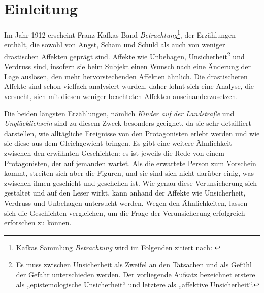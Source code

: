 \documentclass[12pt,a4paper]{article}
\begin{document}
\clearpage


\onehalfspacing
\setlength{\parskip}{0.5\baselineskip}

\section{Einleitung}
%
Im Jahr 1912 erscheint Franz Kafkas Band \textit{Betrachtung}\footnote{Kafkas Sammlung \textit{Betrachtung} wird im Folgenden zitiert nach: \cite{kafka}}, der Erzählungen enthält, die sowohl von Angst, Scham und Schuld als auch von weniger drastischen Affekten geprägt sind. Affekte wie Unbehagen, Unsicherheit\footnote{Es muss zwischen Unsicherheit als Zweifel an den Tatsachen und als Gefühl der Gefahr unterschieden werden. Der vorliegende Aufsatz bezeichnet erstere als „epistemologische Unsicherheit“ und letztere als „affektive Unsicherheit“.} und Verdruss sind, insofern sie beim Subjekt einen Wunsch nach eine Änderung der Lage auslösen, den mehr hervorstechenden Affekten ähnlich. Die drastischeren Affekte sind schon vielfach analysiert wurden, daher lohnt sich eine Analyse, die versucht, sich mit diesen weniger beachteten Affekten auseinanderzusetzen.\par
%
Die beiden längsten Erzählungen, nämlich \textit{Kinder auf der Landstraße} und \textit{Unglücklichsein} sind zu diesem Zweck besonders geeignet, da sie sehr detailliert darstellen, wie alltägliche Ereignisse von den Protagonisten erlebt werden und wie sie diese aus dem Gleichgewicht bringen. Es gibt eine weitere Ähnlichkeit zwischen den erwähnten Geschichten: es ist jeweils die Rede von einem Protagonisten, der auf jemanden wartet. Als die erwartete Person zum Vorschein kommt, streiten sich aber die Figuren, und sie sind sich nicht darüber einig, was zwischen ihnen geschieht und geschehen ist. Wie genau diese Verunsicherung sich gestaltet und auf den Leser wirkt, kann anhand der Affekte wie Unsicherheit, Verdruss und Unbehagen untersucht werden. Wegen den Ähnlichkeiten, lassen sich die Geschichten vergleichen, um die Frage der Verunsicherung erfolgreich erforschen zu können.\par 
%
\clearpage
%
\end{document}
